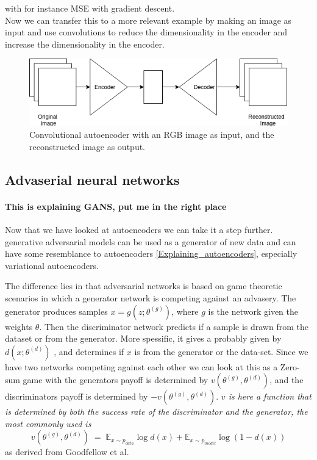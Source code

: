 with for instance MSE with gradient descent. \\
Now we can transfer this to a more relevant example by making an image as input and use convolutions to reduce the dimensionality in the encoder and increase the dimensionality in the encoder.
\begin{figure}[t]
    \centering
    \includegraphics[scale=0.5]{background/figures/CAE.png}
    \caption{Convolutional autoencoder with an RGB image as input, and the reconstructed image as output.}
\end{figure}
    
\subsection{Advaserial neural networks}
\paragraph{This is explaining GANS, put me in the right place} %
Now that we have looked at autoencoders we can take it a step further. 
generative adversarial models can be used as a generator of new data and can have some resemblance to autoencoders \ref{Explaining_autoencoders}, especially variational autoencoders. \cite{Goodfellowetal2016} %

The difference lies in that adversarial networks is based on game theoretic scenarios in which a generator network is competing against an advasery. 
The generator produces samples $x=g(z;\theta^{(g)})$, where $g$ is the network given the weights $\theta$. Then the discriminator network predicts if a sample is drawn from the dataset or from the generator.
More spessific, it gives a probably given by $d(x;\theta^{(d)})$ , and determines if $x$ is from the generator or the data-set. 
Since we have two networks competing against each other we can look at this as a Zero-sum game with the generators payoff is determined by $v(\theta^{(g)},\theta^{(d)})$, and the discriminators payoff is determined by $-v(\theta^{(g)},\theta^{(d)})$.
\textit{$v$ is here a function that is determined by both the success rate of the discriminator and the generator, the most commonly used is}
\begin{equation} %
    v(\theta^{(g)},\theta^{(d)}) \; = \; \mathds{E}_{x\sim p_{data}}\log{d(x)} + \mathds{E}_{x\sim p_{model}}\log{(1 - d(x))} 
\end{equation}
as derived from Goodfellow et al. %
      
